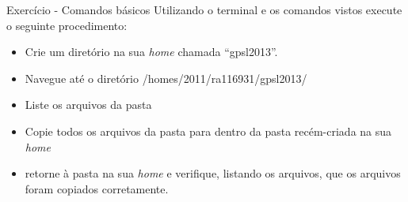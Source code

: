 \documentclass{beamer}
\begin{document}
\begin{frame}{Exercício - Comandos básicos}
  Utilizando o terminal e os comandos vistos execute o seguinte procedimento:
  \begin{itemize}
  \item Crie um diretório na sua \emph{home} chamada ``gpsl2013''.
  \item Navegue até o diretório /homes/2011/ra116931/gpsl2013/
  \item Liste os arquivos da pasta
  \item Copie todos os arquivos da pasta para dentro da pasta recém-criada na
    sua \emph{home}
  \item retorne à pasta na sua \emph{home} e verifique, listando os arquivos,
    que os arquivos foram copiados corretamente.
  \end{itemize}
\end{frame}

\end{document}
